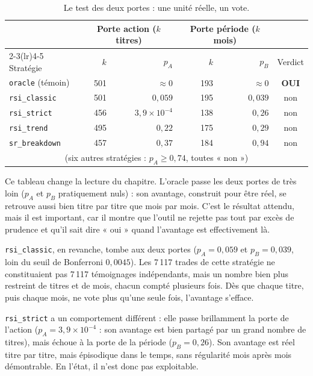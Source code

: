 \begin{table}[H]
\centering
\caption{Le test des deux portes : une unité réelle, un vote.}
\label{tab:b1-dep-portes}
\small
\begin{tabular}{@{}lrrrrc@{}}
\toprule
 & \multicolumn{2}{c}{Porte action ($k$ titres)} & \multicolumn{2}{c}{Porte période ($k$ mois)} & \\
\cmidrule(lr){2-3}\cmidrule(lr){4-5}
Stratégie & $k$ & $p_A$ & $k$ & $p_B$ & Verdict \\
\midrule
\texttt{oracle} (témoin) & 501 & $\approx 0$          & 193 & $\approx 0$ & \textbf{OUI} \\
\midrule
\texttt{rsi\_classic}  & 501 & $0{,}059$            & 195 & $0{,}039$ & non \\
\texttt{rsi\_strict}   & 456 & $3{,}9\times10^{-4}$ & 138 & $0{,}26$  & non \\
\texttt{rsi\_trend}    & 495 & $0{,}22$             & 175 & $0{,}29$  & non \\
\texttt{sr\_breakdown} & 457 & $0{,}37$             & 184 & $0{,}94$  & non \\
\multicolumn{6}{c}{\footnotesize (six autres stratégies : $p_A \ge 0{,}74$, toutes « non »)} \\
\bottomrule
\end{tabular}
\end{table}
Ce tableau change la lecture du chapitre. L'oracle passe les deux
portes de très loin ($p_A$ et $p_B$ pratiquement nuls) : son avantage,
construit pour être réel, se retrouve aussi bien titre par titre que mois par
mois. C'est le résultat attendu, mais il est important, car il montre que
l'outil ne rejette pas tout par excès de prudence et qu'il sait dire
« oui » quand l'avantage est effectivement là.

\texttt{rsi\_classic}, en revanche, tombe aux deux portes
($p_A = 0{,}059$ et $p_B = 0{,}039$, loin du seuil de Bonferroni
$0{,}0045$). Les 7\,117 trades de cette stratégie ne
constituaient pas 7\,117 témoignages indépendants, mais un nombre bien plus
restreint de titres et de mois, chacun compté plusieurs fois. Dès que
chaque titre, puis chaque mois, ne vote plus qu'une seule fois, l'avantage
s'efface.

\texttt{rsi\_strict} a un comportement différent : elle passe brillamment la
porte de l'action ($p_A = 3{,}9\times10^{-4}$ : son avantage est bien partagé
par un grand nombre de titres), mais échoue à la porte de la période
($p_B = 0{,}26$). Son avantage est réel titre par titre, mais
épisodique dans le temps, sans régularité mois après mois
démontrable. En l'état, il n'est donc pas exploitable.

